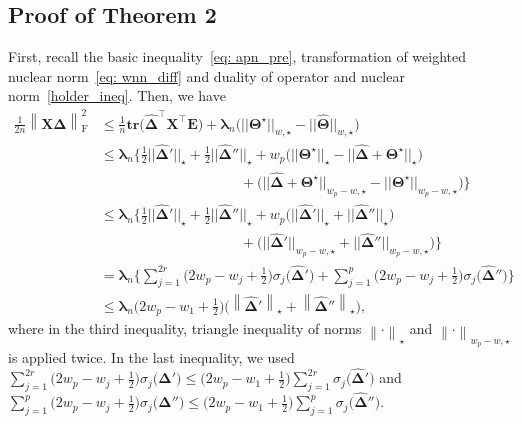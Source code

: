 \documentclass[alpha-refs]{wiley-article}
\begin{document}
\subsection{Proof of Theorem 2}
\label{pf_thm_3_2}
First, recall the basic inequality~\eqref{eq: apn_pre}, transformation of weighted nuclear norm~\eqref{eq: wnn_diff} and duality of operator and nuclear norm~\eqref{holder_ineq}.
Then, we have
\begin{align}
    \frac{1}{2n} \left\| \boldsymbol{X} \boldsymbol{\widehat{\Delta}} \right\|_{\text{F}}^{2}
    &\leq \frac{1}{n} \textbf{tr}\big( \boldsymbol{\widehat{\Delta}}^{\top} \boldsymbol{X}^{\top}\boldsymbol{E} \big) +
    \boldsymbol{\lambda}_{n} \big( ||\boldsymbol{\Theta^{\star}}||_{w,\star} - ||\widehat{\boldsymbol{\Theta}}||_{w,\star} \big) \nonumber \\
    &\leq \boldsymbol{\lambda}_{n}\bigg\{ \frac{1}{2}||\boldsymbol{\widehat{\Delta}}'||_{\star}
    + \frac{1}{2}||\boldsymbol{\widehat{\Delta}}''||_{\star}
    + w_{p}\big( ||\boldsymbol{\Theta^{\star}}||_{\star} - ||\boldsymbol{\widehat{\Delta}}  + \boldsymbol{\Theta^{\star}}||_{\star} \big) \nonumber \\
    &\qquad \qquad \qquad \qquad \qquad + \big( ||\boldsymbol{\widehat{\Delta}} + \boldsymbol{\Theta^{\star}}||_{w_{p}-w,\star} - ||\boldsymbol{\Theta^{\star}}||_{w_{p}-w,\star}\big)\bigg\} \nonumber \\
    &\leq \boldsymbol{\lambda}_{n}\bigg\{ \frac{1}{2}||\boldsymbol{\widehat{\Delta}}'||_{\star}
    + \frac{1}{2}||\boldsymbol{\widehat{\Delta}}''||_{\star}
    + w_{p}\big( ||\boldsymbol{\widehat{\Delta}}'||_{\star} + ||\boldsymbol{\widehat{\Delta}}''||_{\star} \big) \nonumber \\
    &\qquad \qquad \qquad \qquad \qquad + \big( ||\boldsymbol{\widehat{\Delta}}'||_{w_{p}-w,\star} + ||\boldsymbol{\widehat{\Delta}}''||_{w_{p}-w,\star}\big)\bigg\} \nonumber \\
    &=\boldsymbol{\lambda}_{n}\bigg\{ \sum_{j=1}^{2r}\bigg(2w_{p}-w_{j}+\frac{1}{2}\bigg)\sigma_{j}\big(\boldsymbol{\widehat{\Delta}}'\big) + \sum_{j=1}^{p}\bigg(2w_{p}-w_{j}+\frac{1}{2}\bigg)\sigma_{j}\big(\boldsymbol{\widehat{\Delta}}''\big)\bigg\} \nonumber \\
    &\leq \boldsymbol{\lambda}_{n} \bigg( 2w_{p}-w_{1}+\frac{1}{2} \bigg)
    \bigg( \left\|\boldsymbol{\widehat{\Delta}}'\right\|_{\star} + \left\|\boldsymbol{\widehat{\Delta}}'' \right\|_{\star} \bigg),  \label{eq: basic}
\end{align}
where in the third inequality, triangle inequality of norms $\left\| \cdot \right\|_{\star}$ and $\left\| \cdot \right\|_{w_{p}-w,\star}$ is applied twice.
In the last inequality, we used
$\sum_{j=1}^{2r}\big(2w_{p}-w_{j}+\frac{1}{2}\big)\sigma_{j}\big(\boldsymbol{\widehat{\Delta}}'\big)\leq \big(2w_{p}-w_{1}+\frac{1}{2}\big) \sum_{j=1}^{2r}\sigma_{j}\big(\boldsymbol{\widehat{\Delta}}'\big)$ and
$\sum_{j=1}^{p}\big(2w_{p}-w_{j}+\frac{1}{2}\big)\sigma_{j}\big(\boldsymbol{\widehat{\Delta}}''\big)\leq \big(2w_{p}-w_{1}+\frac{1}{2}\big) \sum_{j=1}^{p}\sigma_{j}\big(\boldsymbol{\widehat{\Delta}}''\big)$.
\end{document}
